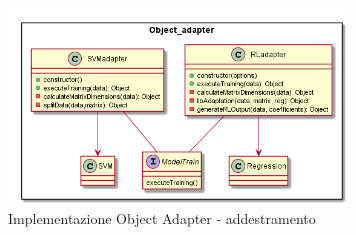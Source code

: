 \documentclass[../manuale-sviluppatore.tex]{subfiles}
\begin{document}
\begin{figure}[H]
    \begin{center}
         \includegraphics[width=9cm]{img/objectAdapterTA.png}
         \caption{Implementazione Object Adapter - addestramento}
         \label{fig:object_adapter}
     \end{center}
 \end{figure}
\end{document}
